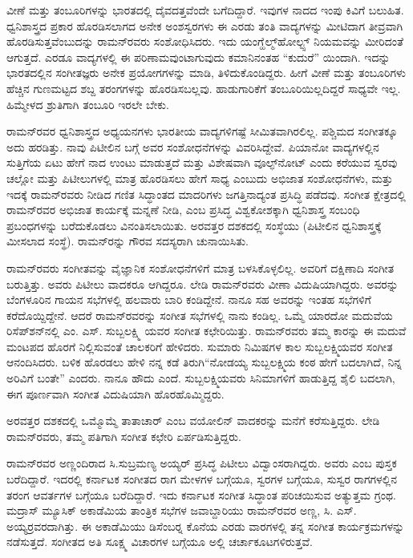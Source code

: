 ವೀಣೆ ಮತ್ತು ತಂಬೂರಿಗಳನ್ನು ಭಾರತದಲ್ಲಿ ದೈವದತ್ತವೆಂದೇ ಬಗೆದಿದ್ದಾರೆ. ಇವುಗಳ ನಾದದ ಇಂಪು ಕಿವಿಗೆ ಬಲುಹಿತ. ಧ್ವನಿಶಾಸ್ತ್ರದ ಪ್ರಕಾರ ಹೊರಡಿಸಲಾಗದ ಅನೇಕ ಅಂಶಸ್ವರಗಳು ಈ ಎರಡು ತಂತಿ ವಾದ್ಯಗಳನ್ನು ಮೀಟಿದಾಗ ತೀವ್ರವಾಗಿ ಹೊರಡಿಸುತ್ತವೆಂಬುದನ್ನು ರಾಮನ್‍ರವರು ಸಂಶೋಧಿಸಿದರು. ಇದು ಯಂಗ್\enginline{--}ಹೆಲ್ಮ್‌ಹೋಲ್ಟ್ಸ್ ನಿಯಮವನ್ನು ಮೀರಿದಂತೆ ಆಗುತ್ತದೆ. ಎರಡೂ ವಾದ್ಯಗಳಲ್ಲಿ ಈ ಪರಿಣಾಮವುಂಟಾಗುವುದು ಕಮಾನಿನಂತಹ “ಕುದುರೆ” ಯಿಂದಾಗಿ. ಇದನ್ನು ಭಾರತದಲ್ಲಿನ ಸಂಗೀತಜ್ಞರು ಅನೇಕ ಪ್ರಯೋಗಗಳನ್ನು ಮಾಡಿ, ತಿಳಿದುಕೊಂಡಿದ್ದರು. ಹೀಗೆ ವೀಣೆ ಮತ್ತು ತಂಬೂರಿಗಳು ಹೆಚ್ಚಿನ ಗುಣಮಟ್ಟದ ಶಬ್ದ ತರಂಗಗಳನ್ನು ಹೊರಡಿಸಬಲ್ಲವು. ಹಾಡುಗಾರಿಕೆಗೆ ತಂಬೂರಿಯಿಲ್ಲದಿದ್ದರೆ ಸಾಧ್ಯವೇ ಇಲ್ಲ. ಹಿಮ್ಮೇಳದ ಶ್ರುತಿಗಾಗಿ ತಂಬೂರಿ ಇರಲೇ ಬೇಕು.

ರಾಮನ್‍ರವರ ಧ್ವನಿಶಾಸ್ತ್ರದ ಅಧ್ಯಯನಗಳು ಭಾರತೀಯ ವಾದ್ಯಗಳಿಗಷ್ಟೆ ಸೀಮಿತವಾಗಿರಲಿಲ್ಲ. ಪಶ್ಚಿಮದ ಸಂಗೀತಕ್ಕೂ ಅದು ಹರಡಿತ್ತು. ನಾವು ಪಿಟೀಲಿನ ಬಗ್ಗೆ ಅವರ ಸಂಶೋಧನೆಗಳನ್ನು ವಿವರಿಸಿದ್ದೇವೆ. ಪಿಯಾನೋ ವಾದ್ಯಗಳಲ್ಲಿನ ಸುತ್ತಿಗೆಯ ಏಟು ಹೇಗೆ ನಾದ ಉಂಟು ಮಾಡುತ್ತದೆ ಮತ್ತು ವಿಶೇಷವಾಗಿ ವೂಲ್ಫ್‌ನೋಟ್ ಎಂದು ಕರೆಯುವ ಸ್ವರವು ಚಲ್ಲೋ ಮತ್ತು ಪಿಟೀಲುಗಳಲ್ಲಿ ಮಾತ್ರ ಹೊರಡಿಸಲು ಹೇಗೆ ಸಾಧ್ಯ ಎಂಬುದು ಅಭಿಜಾತ ಸಂಶೋಧನೆಗಳು, ಮತ್ತು ಇದಕ್ಕೆ ರಾಮನ್‍ರವರು ನೀಡಿದ ಗಣಿತ ಸಿದ್ಧಾಂತದ ಮಾದರಿಗಳು ಜಗತ್ತಿನಾದ್ಯಂತ ಪ್ರಸಿದ್ಧಿ ಪಡೆದವು. ಸಂಗೀತ ಕ್ಷೇತ್ರದಲ್ಲಿ ರಾಮನ್‍ರವರ ಅಭಿಜಾತ ಕಾರ್ಯಕ್ಕೆ ಮನ್ನಣೆ ನೀಡಿ, \textit{} ಎಂಬ ಪ್ರಸಿದ್ಧ ವಿಶ್ವಕೋಶಕ್ಕಾಗಿ ಧ್ವನಿಶಾಸ್ತ್ರ ಸಂಬಂಧಿ ಪ್ರಬಂಧಗಳನ್ನು ಬರೆದುಕೊಡಲು ವಿನಂತಿಸಲಾಯಿತು. ಅರವತ್ತರ ದಶಕದಲ್ಲಿ  ಸಂಸ್ಥೆಯು (ಪಿಟೀಲಿನ ಧ್ವನಿಶಾಸ್ತ್ರಕ್ಕೆ ಮೀಸಲಾದ ಸಂಸ್ಥೆ). ರಾಮನ್‍ರನ್ನು ಗೌರವ ಸದಸ್ಯರಾಗಿ ಚುನಾಯಿಸಿತು.

ರಾಮನ್‍ರವರು ಸಂಗೀತವನ್ನು ವೈಜ್ಞಾನಿಕ ಸಂಶೋಧನೆಗಳಿಗೆ ಮಾತ್ರ ಬಳಸಿಕೊಳ್ಳಲಿಲ್ಲ. ಅವರಿಗೆ ದಕ್ಷಿಣಾದಿ ಸಂಗೀತ ಬರುತ್ತಿತ್ತು. ಅವರು ಪಿಟೀಲು ವಾದಕರೂ ಆಗಿದ್ದರೂ. ಲೇಡಿ ರಾಮನ್‍ರವರು ವೀಣಾ ವಿದುಷಿಯಾಗಿದ್ದರು. ಅವರನ್ನು ಬೆಂಗಳೂರಿನ ಗಾಯನ ಸಭೆಗಳಲ್ಲಿ ಹಲವಾರು ಬಾರಿ ಕಂಡಿದ್ದೇನೆ. ನಾನೂ ಸಹ ಅವರನ್ನು ಇಂತಹ ಸಭೆಗಳಿಗೆ ಕರೆದೊಯ್ದಿದ್ದೇನೆ. ಆದರೆ ರಾಮನ್‍ರವರನ್ನು ಸಂಗೀತ ಸಭೆಗಳಲ್ಲಿ ನಾನು ಕಂಡಿಲ್ಲ. ಒಮ್ಮೆ ಯಾರದೋ ಮದುವೆಯ ರಿಸೆಪ್‍ಶನ್‍ನಲ್ಲಿ ಎಂ. ಎಸ್. ಸುಬ್ಬಲಕ್ಷ್ಮಿ ಯವರ ಸಂಗೀತ ಕಛೇರಿಯಿತ್ತು. ರಾಮನ್‍ರವರು ತಮ್ಮ ಕಾರನ್ನು ಈ ಮದುವೆ ಮಂಟಪದ ಹೊರಗೆ ನಿಲ್ಲಿಸುವಂತೆ ಚಾಲಕರಿಗೆ ಹೇಳಿದರು. ಸುಮಾರು  ನಿಮಿಷಗಳ ಕಾಲ ಸುಬ್ಬಲಕ್ಷ್ಮಿಯವರ ಸಂಗೀತ ಆನಂದಿಸಿದರು. ಬಳಿಕ ಹೊರಡಲು ಹೇಳಿ ನನ್ನ ಕಡೆ ತಿರುಗಿ\enginline{--}“ನೋಡಯ್ಯ ಸುಬ್ಬಲಕ್ಷ್ಮಿಯ ಕಂಠ ಹೇಗೆ ಬದಲಾಗಿದೆ, ನಿನ್ನ ಅರಿವಿಗೆ ಬಂತೇ” ಎಂದರು. ನಾನೂ ಹೌದು ಎಂದೆ. ಸುಬ್ಬಲಕ್ಷ್ಮಿಯವರು ಸಿನಿಮಾಗಳಿಗೆ ಹಾಡುತ್ತಿದ್ದ ಶೈಲಿ ಬದಲಾಗಿ, ಈಗ ಪೂರ್ಣವಾಗಿ ಸಂಗೀತ ವಿದುಷಿಯಾಗಿ ಹೊರಹೊಮ್ಮಿದ್ದರು.

ಅರವತ್ತರ ದಶಕದಲ್ಲಿ ಒಮ್ಮೊಮ್ಮೆ ತಾತಾಚಾರ್ ಎಂಬ ವಯೋಲಿನ್ ವಾದಕರನ್ನು ಮನೆಗೆ ಕರೆಸು\-ತ್ತಿದ್ದರು. ಲೇಡಿ ರಾಮನ್‍ರವರು, ತಮ್ಮ ಪತಿಗಾಗಿ ಸಂಗೀತ ಕಛೇರಿ ಏರ್ಪಡಿಸುತ್ತಿದ್ದರು.

ರಾಮನ್‍ರವರ ಅಣ್ಣಂದಿರಾದ ಸಿ.ಸುಬ್ರಮಣ್ಯ ಅಯ್ಯರ್ ಪ್ರಸಿದ್ಧ ಪಿಟೀಲು ವಿದ್ವಾಂಸರಾಗಿದ್ದರು. ಅವರು \textit{} ಎಂಬ ಪುಸ್ತಕ ಬರೆದಿದ್ದಾರೆ. ಇದರಲ್ಲಿ ಕರ್ನಾಟಕ ಸಂಗೀತದ ರಾಗ ಮೇಳಗಳ ಬಗ್ಗೆಯೂ, ಸ್ವರಗಳ ಬಗ್ಗೆಯೂ, ಸುಸ್ವರ ರಾಗಗಳಲ್ಲಿನ ತರಂಗ ಆವರ್ತಗಳ ಬಗ್ಗೆಯೂ ಬರೆದಿದ್ದಾರೆ. ಇದು ಕರ್ನಾಟಕ ಸಂಗೀತ ಸಿದ್ಧಾಂತ ಪರಿಚಯಿಸುವ ಅತ್ಯುತ್ತಮ ಗ್ರಂಥ. ಮದ್ರಾಸ್ ಮ್ಯೂಸಿಕ್ ಅಕಾಡೆಮಿಯ ತಾಂತ್ರಿಕ ಸಭೆಗಳ ಜವಾಬ್ದಾರಿಯು ರಾಮನ್‍ರವರ ಅಣ್ಣ, ಸಿ. ಎಸ್. ಅಯ್ಯರ್‍ರವರದಾಗಿತ್ತು. ಈ ಅಕಾಡೆಮಿಯು ಡಿಸೆಂಬರ್‍ನ ಕೊನೆಯ ಎರಡು ವಾರಗಳಲ್ಲಿ ತನ್ನ ಸಂಗೀತ ಕಾರ್ಯಕ್ರಮಗಳನ್ನು ನಡೆಸುತ್ತದೆ. ಸಂಗೀತದ ಅತಿ ಸೂಕ್ಷ್ಮ ವಿಚಾರಗಳ ಬಗ್ಗೆಯೂ ಅಲ್ಲಿ ಚರ್ಚಾಕೂಟಗಳಿರುತ್ತವೆ.

